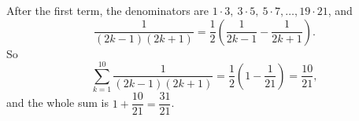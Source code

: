 After the first term, the denominators are $1\cdot3,\ 3\cdot5,\ 5\cdot7,\dots,19\cdot21$, and
\[\dfrac1{(2k-1)(2k+1)}=\dfrac12\left(\dfrac1{2k-1}-\dfrac1{2k+1}\right).\]
So
\[\sum_{k=1}^{10}\dfrac1{(2k-1)(2k+1)}=\dfrac12\left(1-\dfrac1{21}\right)=\dfrac{10}{21},\]
and the whole sum is $1+\dfrac{10}{21}=\boxed{\dfrac{31}{21}}$.
